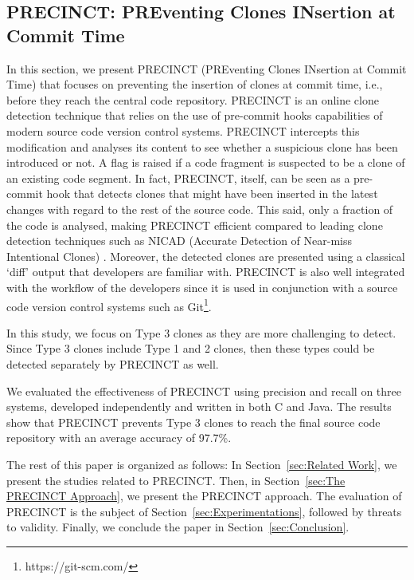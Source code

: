 

\subsection{PRECINCT: PREventing Clones INsertion at Commit Time}

In this section, we present PRECINCT (PREventing Clones INsertion at Commit Time) that focuses on preventing the insertion of clones at commit time, i.e., before they reach the central code repository. PRECINCT is an online clone detection technique that relies on the use of pre-commit hooks capabilities of modern source code version control systems.
PRECINCT intercepts this modification and analyses its  content to see whether a suspicious clone has been introduced or not.
A flag is raised if a code fragment is suspected to be a clone of an existing code segment.
In fact, PRECINCT, itself, can be seen as a pre-commit hook that detects clones that might have been inserted in the latest changes with regard to the rest of the source code.
This said, only a fraction of the code is analysed, making PRECINCT efficient compared to leading  clone detection techniques such as NICAD (Accurate Detection of Near-miss Intentional Clones) \cite{Cordy2011}.
Moreover, the detected clones are presented using a classical `diff' output that developers are familiar with.
PRECINCT is also well integrated with the workflow of the developers since it is used in conjunction with a source code version control systems such as Git\footnote{https://git-scm.com/}.

In this study, we focus on Type 3 clones as they are more challenging to detect. Since Type 3 clones include Type 1 and 2 clones, then these types could be detected separately by PRECINCT as well.

We evaluated the effectiveness of PRECINCT using precision and recall on three systems, developed independently and written in both C and Java. The results show that PRECINCT prevents Type 3 clones to reach the final source code repository with an average accuracy of 97.7\%.

The rest of this paper is organized as follows: In Section~\ref{sec:Related Work}, we present the studies related to PRECINCT. Then, in Section~\ref{sec:The PRECINCT Approach}, we present the PRECINCT approach. The evaluation of PRECINCT is the subject of  Section~\ref{sec:Experimentations}, followed by threats to validity.
Finally, we conclude the paper in Section~\ref{sec:Conclusion}.


